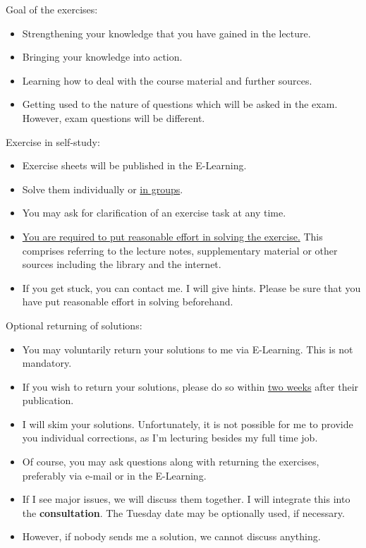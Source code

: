 Goal of the exercises:
\begin{itemize}
	\item Strengthening your knowledge that you have gained in the lecture.
	\item Bringing your knowledge into action.
	\item Learning how to deal with the course material and further sources.
	\item Getting used to the nature of questions which will be asked in the exam. However, exam questions will be different.
\end{itemize}

Exercise in self-study:
\begin{itemize}
	\item Exercise sheets will be published in the E-Learning.
	\item Solve them individually or \underline{in groups}.
	\item You may ask for clarification of an exercise task at any time.
	\item \underline{You are required to put reasonable effort in solving the exercise.} This comprises referring to the lecture notes, supplementary material or other sources including the library and the internet.
	\item If you get stuck, you can contact me. I will give hints. Please be sure that you have put reasonable effort in solving beforehand.
\end{itemize}

Optional returning of solutions:
\begin{itemize}
	\item You may voluntarily return your solutions to me via E-Learning. This is not mandatory.
	\item If you wish to return your solutions, please do so within \underline{two weeks} after their publication.
	\item I will skim your solutions. Unfortunately, it is not possible for me to provide you individual corrections, as I'm lecturing besides my full time job.
	\item Of course, you may ask questions along with returning the exercises, preferably via e-mail or in the E-Learning.
	\item If I see major issues, we will discuss them together. I will integrate this into the \textbf{consultation}. The Tuesday date may be optionally used, if necessary.
	\item However, if nobody sends me a solution, we cannot discuss anything.
\end{itemize}


